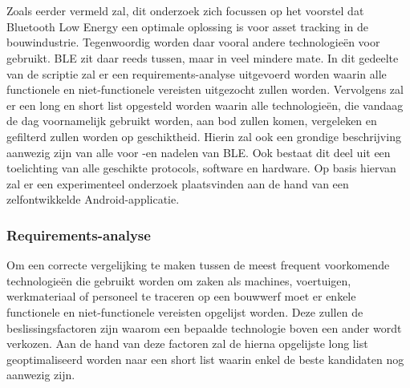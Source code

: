 
\chapter{}%
\label{ch:methodologie}


Zoals eerder vermeld zal, dit onderzoek zich focussen op het voorstel dat Bluetooth Low Energy een optimale oplossing is voor asset tracking in de bouwindustrie. Tegenwoordig worden daar vooral andere technologieën voor gebruikt. BLE zit daar reeds tussen, maar in veel mindere mate. In dit gedeelte van de scriptie zal er een requirements-analyse uitgevoerd worden waarin alle functionele en niet-functionele vereisten uitgezocht zullen worden. Vervolgens zal er een long en short list opgesteld worden waarin alle technologieën, die vandaag de dag voornamelijk gebruikt worden, aan bod zullen komen, vergeleken en gefilterd zullen worden op geschiktheid. Hierin zal ook een grondige beschrijving aanwezig zijn van alle voor -en nadelen van BLE. Ook bestaat dit deel uit een toelichting van alle geschikte protocols, software en hardware. Op basis hiervan zal er een experimenteel onderzoek plaatsvinden aan de hand van een zelfontwikkelde Android-applicatie.

\subsection{Requirements-analyse}
Om een correcte vergelijking te maken tussen de meest frequent voorkomende technologieën die gebruikt worden om zaken als machines, voertuigen, werkmateriaal of personeel te traceren op een bouwwerf moet er enkele functionele en niet-functionele vereisten opgelijst worden. Deze zullen de beslissingsfactoren zijn waarom een bepaalde technologie boven een ander wordt verkozen. Aan de hand van deze factoren zal de hierna opgelijste long list geoptimaliseerd worden naar een short list waarin enkel de beste kandidaten nog aanwezig zijn.\\

